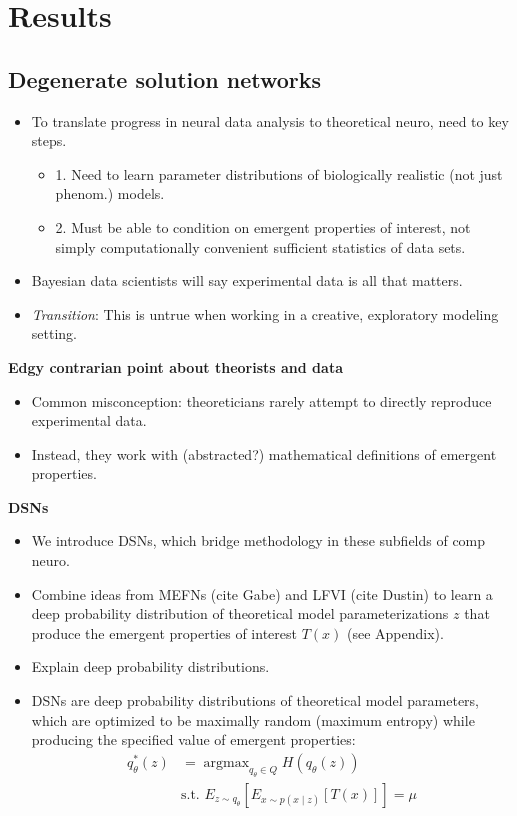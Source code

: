 \documentclass[11pt]{article}
\DeclareMathOperator*{\argmax}{argmax}
\begin{document}
\section{Results}
\subsection{Degenerate solution networks}
\begin{itemize}
\item To translate progress in neural data analysis to theoretical neuro, need to key steps.
\begin{itemize}
\item 1. Need to learn parameter distributions of biologically realistic (not just phenom.) models.
\item 2. Must be able to condition on emergent properties of interest, not simply computationally convenient sufficient statistics of data sets.
\end{itemize}
\item Bayesian data scientists will say experimental data is all that matters.  
\item \textit{Transition}: This is untrue when working in a creative, exploratory modeling setting.
\end{itemize}

\textbf{Edgy contrarian point about theorists and data}
\begin{itemize}
\item Common misconception: theoreticians rarely attempt to directly reproduce experimental data. 
\item Instead, they work with (abstracted?) mathematical definitions of emergent properties.  
\end{itemize}

\textbf{DSNs}
\begin{itemize}
\item We introduce DSNs, which bridge methodology in these subfields of comp neuro.
\item  Combine ideas from MEFNs (cite Gabe) and LFVI (cite Dustin) to learn a deep probability distribution of theoretical model parameterizations $z$ that produce the emergent properties of interest $T(x)$ (see Appendix).  
\item Explain deep probability distributions.
\item DSNs are deep probability distributions of theoretical model parameters, which are optimized to be maximally random (maximum entropy) while producing the specified value of emergent properties:
\begin{equation}
\begin{split}
q_\theta^*(z) &= \argmax_{q_\theta \in Q} H(q_\theta(z)) \\
 &  \text{s.t.  } E_{z \sim q_\theta}\left[ E_{x\sim p(x \mid z)}\left[T(x)\right] \right] = \mu \\
 \end{split}
\end{equation}
\end{itemize}
\end{document}
